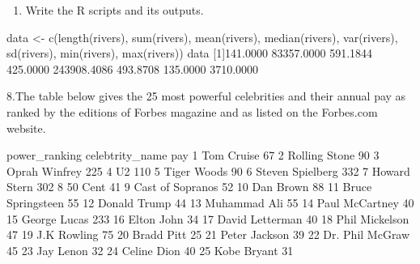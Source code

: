 \documentclass[
]{article}
\newenvironment{Shaded}{\begin{snugshade}}{\end{snugshade}}
\newcommand{\NormalTok}[1]{#1}
\providecommand{\tightlist}{%
  \setlength{\itemsep}{0pt}\setlength{\parskip}{0pt}}
\begin{document}
\begin{enumerate}
\def\labelenumi{\alph{enumi}.}
\setcounter{enumi}{2}
\tightlist
\item
  Write the R scripts and its outputs.
\end{enumerate}

\begin{Shaded}
\begin{Highlighting}[]
\NormalTok{data \textless{}{-} c(length(rivers), sum(rivers), mean(rivers), median(rivers), var(rivers),}
\NormalTok{          sd(rivers), min(rivers), max(rivers))}
\NormalTok{data}
\NormalTok{[1]141.0000  83357.0000    591.1844    425.0000 243908.4086    493.8708    135.0000   3710.0000}
\end{Highlighting}
\end{Shaded}

8.The table below gives the 25 most powerful celebrities and their
annual pay as ranked by the editions of Forbes magazine and as listed on
the Forbes.com website.

\begin{Shaded}
\begin{Highlighting}[]
\NormalTok{ power\_ranking   celebtrity\_name   pay}
\NormalTok{            1        Tom Cruise    67}
\NormalTok{            2     Rolling Stone    90}
\NormalTok{            3     Oprah Winfrey    225}
\NormalTok{            4                U2    110}
\NormalTok{            5       Tiger Woods    90}
\NormalTok{            6  Steven Spielberg    332}
\NormalTok{            7      Howard Stern    302}
\NormalTok{            8           50 Cent    41}
\NormalTok{            9  Cast of Sopranos    52}
\NormalTok{            10         Dan Brown   88}
\NormalTok{            11 Bruce Springsteen   55}
\NormalTok{            12      Donald Trump   44}
\NormalTok{            13      Muhammad Ali   55}
\NormalTok{            14    Paul McCartney   40}
\NormalTok{            15      George Lucas   233}
\NormalTok{            16        Elton John   34}
\NormalTok{            17   David Letterman   40}
\NormalTok{            18    Phil Mickelson   47}
\NormalTok{            19       J.K Rowling   75}
\NormalTok{            20        Bradd Pitt   25}
\NormalTok{            21     Peter Jackson   39}
\NormalTok{            22   Dr. Phil McGraw   45}
\NormalTok{            23       Jay   Lenon   32}
\NormalTok{            24       Celine Dion   40}
\NormalTok{            25       Kobe Bryant   31}
\end{Highlighting}
\end{Shaded}
\end{document}
